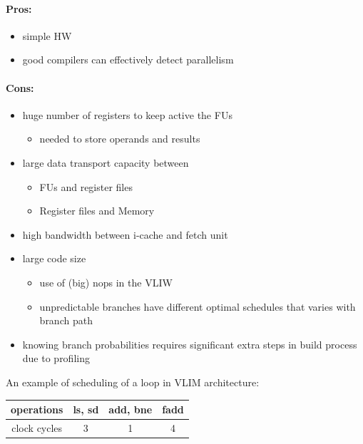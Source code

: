 \paragraph{Pros:}
\begin{itemize}
    \item[] simple HW
    \item[] good compilers can effectively detect parallelism
\end{itemize}
\paragraph{Cons:}
\begin{itemize}
    \item huge number of registers to keep active the FUs
    \begin{itemize}
        \item needed to store operands and results
    \end{itemize}
    \item large data transport capacity between
    \begin{itemize}
        \item FUs and register files
        \item Register files and Memory
    \end{itemize}
    \item high bandwidth between i-cache and fetch unit
    \item large code size
    \begin{itemize}
        \item use of (big) nops in the VLIW
        \item unpredictable branches have different optimal schedules that varies with branch path
    \end{itemize}
    \item knowing branch probabilities requires significant extra steps in build process due to profiling
\end{itemize}


An example of scheduling of a loop in VLIM architecture:
\begin{table}[h]
    \centering
    \begin{tabular}{c|c|c|c}
        \toprule
        operations & \textbf{ls, sd} & \textbf{add, bne} & \textbf{fadd} \\
        \midrule
        clock cycles & 3 & 1 & 4\\
        \bottomrule
    \end{tabular}
    \label{tab:}
\end{table}

